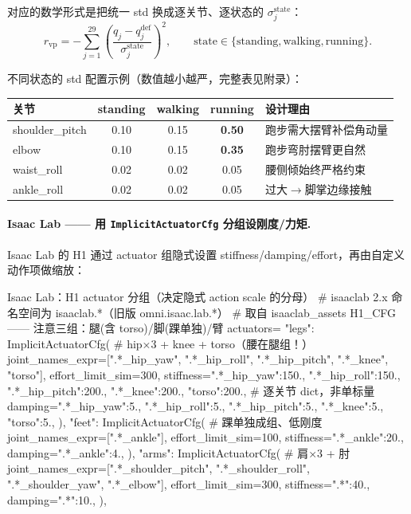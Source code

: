 对应的数学形式是把统一 std 换成逐关节、逐状态的 $\sigma_j^{\mathrm{state}}$：
\begin{equation}
r_{\mathrm{vp}} = -\sum_{j=1}^{29}\left(\frac{q_j-q_j^{\mathrm{def}}}{\sigma_j^{\mathrm{state}}}\right)^2,
\qquad \mathrm{state}\in\{\text{standing},\text{walking},\text{running}\}.
\label{eq:rlmc-hl-vp}
\end{equation}

不同状态的 std 配置示例（数值越小越严，完整表见附录）：

\begin{center}
\small
\begin{tabular}{lccc l}
\hline
关节 & standing & walking & running & 设计理由 \\
\hline
shoulder\_pitch & 0.10 & 0.15 & \textbf{0.50} & 跑步需大摆臂补偿角动量 \\
elbow & 0.10 & 0.15 & \textbf{0.35} & 跑步弯肘摆臂更自然 \\
waist\_roll & 0.02 & 0.02 & 0.05 & 腰侧倾始终严格约束 \\
ankle\_roll & 0.02 & 0.02 & 0.05 & 过大$\to$脚掌边缘接触 \\
\hline
\end{tabular}
\end{center}

\paragraph{Isaac Lab —— 用 \texttt{ImplicitActuatorCfg} 分组设刚度/力矩.}
Isaac Lab 的 H1 通过 actuator 组隐式设置 stiffness/damping/effort，再由自定义动作项做缩放：

\begin{codebox}[Python]{Isaac Lab：H1 actuator 分组（决定隐式 action scale 的分母）}
# isaaclab 2.x 命名空间为 isaaclab.*（旧版 omni.isaac.lab.*）
# 取自 isaaclab_assets H1_CFG —— 注意三组：腿(含 torso)/脚(踝单独)/臂
actuators={
    "legs": ImplicitActuatorCfg(                            # hip×3 + knee + torso（腰在腿组！）
        joint_names_expr=[".*_hip_yaw", ".*_hip_roll", ".*_hip_pitch", ".*_knee", "torso"],
        effort_limit_sim=300,
        stiffness={".*_hip_yaw":150., ".*_hip_roll":150., ".*_hip_pitch":200.,
                   ".*_knee":200., "torso":200.},           # 逐关节 dict，非单标量
        damping={".*_hip_yaw":5., ".*_hip_roll":5., ".*_hip_pitch":5.,
                 ".*_knee":5., "torso":5.},
    ),
    "feet": ImplicitActuatorCfg(                            # 踝单独成组、低刚度
        joint_names_expr=[".*_ankle"],
        effort_limit_sim=100, stiffness={".*_ankle":20.}, damping={".*_ankle":4.},
    ),
    "arms": ImplicitActuatorCfg(                            # 肩×3 + 肘
        joint_names_expr=[".*_shoulder_pitch", ".*_shoulder_roll", ".*_shoulder_yaw", ".*_elbow"],
        effort_limit_sim=300, stiffness={".*":40.}, damping={".*":10.},
    ),
}
\end{codebox}

